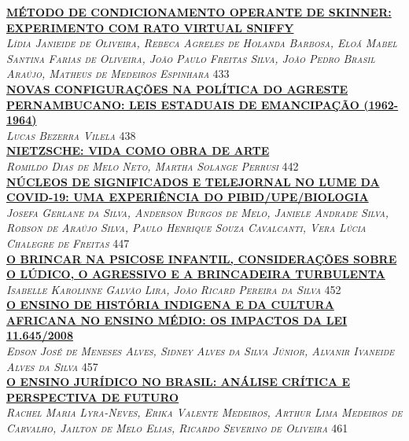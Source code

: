 \noindent \textsc{\hyperlink{trabalhos/249527.pdf.1}{\textbf{MÉTODO DE CONDICIONAMENTO OPERANTE DE SKINNER: EXPERIMENTO COM RATO VIRTUAL SNIFFY}}}\\ 
\noindent \textsc{\textit{Lídia Janieide de Oliveira, Rebeca Agreles de Holanda Barbosa, Eloá Mabel Santina Farias de Oliveira, João Paulo Freitas Silva, João Pedro Brasil Araújo, Matheus de Medeiros Espinhara}} \hfill 433\\ 

\noindent \textsc{\hyperlink{trabalhos/251636.pdf.1}{\textbf{NOVAS CONFIGURAÇÕES NA POLÍTICA DO AGRESTE PERNAMBUCANO: LEIS ESTADUAIS DE EMANCIPAÇÃO (1962-1964)}}}\\ 
\noindent \textsc{\textit{Lucas Bezerra Vilela}} \hfill 438\\ 

\noindent \textsc{\hyperlink{trabalhos/250308.pdf.1}{\textbf{NIETZSCHE: VIDA COMO OBRA DE ARTE}}}\\ 
\noindent \textsc{\textit{Romildo Dias de Melo Neto, Martha Solange Perrusi}} \hfill 442\\ 

\noindent \textsc{\hyperlink{trabalhos/251333.pdf.1}{\textbf{NÚCLEOS DE SIGNIFICADOS E TELEJORNAL NO LUME   DA COVID-19:  UMA EXPERIÊNCIA DO PIBID/UPE/BIOLOGIA}}}\\ 
\noindent \textsc{\textit{Josefa Gerlane da Silva, Anderson Burgos de Melo, Janiele Andrade Silva, Robson de Araújo Silva, Paulo Henrique Souza Cavalcanti, Vera Lúcia Chalegre de Freitas}} \hfill 447\\ 

\noindent \textsc{\hyperlink{trabalhos/249378.pdf.1}{\textbf{O BRINCAR NA PSICOSE INFANTIL, CONSIDERAÇÕES SOBRE O  LÚDICO, O AGRESSIVO E A BRINCADEIRA TURBULENTA }}}\\ 
\noindent \textsc{\textit{Isabelle Karolinne Galvão Lira, João Ricard Pereira da Silva}} \hfill 452\\ 

\noindent \textsc{\hyperlink{trabalhos/251749.pdf.1}{\textbf{O ENSINO DE HISTÓRIA INDIGENA E DA CULTURA AFRICANA NO ENSINO MÉDIO: OS IMPACTOS DA LEI 11.645/2008}}}\\ 
\noindent \textsc{\textit{Edson José de Meneses Alves, Sidney Alves da Silva Júnior, Alvanir Ivaneide Alves da Silva}} \hfill 457\\ 

\noindent \textsc{\hyperlink{trabalhos/250025.pdf.1}{\textbf{O ENSINO JURÍDICO NO BRASIL: ANÁLISE CRÍTICA E PERSPECTIVA DE FUTURO}}}\\ 
\noindent \textsc{\textit{Rachel Maria Lyra-Neves, Erika Valente Medeiros, Arthur Lima Medeiros de Carvalho, Jailton de Melo Elias, Ricardo Severino de Oliveira}} \hfill 461\\ 

